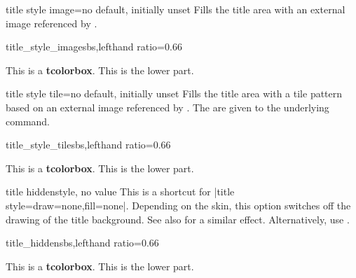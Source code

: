 \clearpage
\begin{docTcbKey}{title style image}{=}{no default, initially unset}
  Fills the title area with an external image referenced by .
\begin{exdispExample*}{title_style_image}{sbs,lefthand ratio=0.66}

\begin{tcolorbox}[enhanced,title=My title,
  title style image=blueshade.png]
This is a \textbf{tcolorbox}.
\tcblower
This is the lower part.
\end{tcolorbox}
\end{exdispExample*}
\end{docTcbKey}


\begin{docTcbKey}{title style tile}{=}{no default, initially unset}
  Fills the title area with a tile pattern based on an external image referenced by .
  The  are given to the underlying  command.
\begin{exdispExample*}{title_style_tile}{sbs,lefthand ratio=0.66}

\begin{tcolorbox}[enhanced,title=My title,
  title style tile={width=1cm}{pink_marble.png}]
This is a \textbf{tcolorbox}.
\tcblower
This is the lower part.
\end{tcolorbox}
\end{exdispExample*}
\end{docTcbKey}


\begin{docTcbKey}{title hidden}{}{style, no value}
  This is a shortcut for |title style={draw=none,fill=none}|.
  Depending on the skin, this option switches off the drawing of the
  title background. See also  for a similar effect.
  Alternatively, use .
\begin{exdispExample*}{title_hidden}{sbs,lefthand ratio=0.66}

\begin{tcolorbox}[title=My title,
  enhanced,title hidden]
This is a \textbf{tcolorbox}.
\tcblower
This is the lower part.
\end{tcolorbox}
\end{exdispExample*}
\end{docTcbKey}


